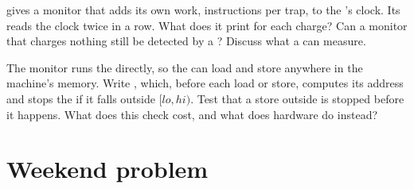 \begin{exercise}[$\star\star\star$]\label{exo:b3:virtualisation:11}
 gives a monitor that adds its own work,  instructions per trap, to the 's clock. Its  reads the clock twice in a row. What does it print for each charge? Can a monitor that charges nothing still be detected by a ? Discuss what a  can measure.
\end{exercise}

\begin{exercise}[$\star\star\star$]\label{exo:b3:virtualisation:12}
The monitor runs the  directly, so the  can load and store anywhere in the machine's memory. Write , which, before each  load or store, computes its address and stops the  if it falls outside $[\mathit{lo}, \mathit{hi})$. Test that a store outside is stopped before it happens. What does this check cost, and what does hardware do instead?
\end{exercise}

\section{Weekend problem}\label{sec:b3:virtualisation:problem}

